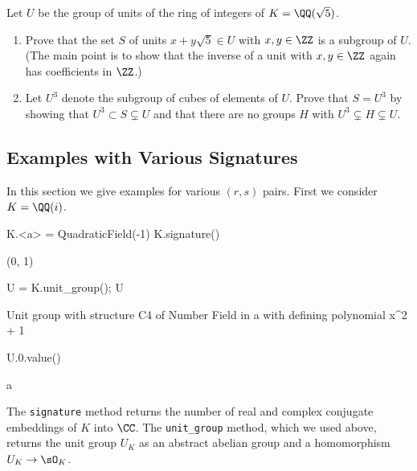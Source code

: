 \begin{exercise}
  Let $U$ be the group of units of the ring of integers
  of $K=\QQ(\sqrt{5})$.
  \begin{enumerate}
    \item Prove that the set $S$ of units $x+y\sqrt{5} \in U$ with
    $x,y\in\ZZ$ is a subgroup of $U$.  (The main point is to show that
    the inverse of a unit with $x,y\in\ZZ$ again has coefficients in
    $\ZZ$.)
    \item Let $U^3$ denote the subgroup of cubes of elements of $U$.
    Prove that $S=U^3$ by showing that $U^3\subset S \subsetneq U$ and
    that there are no groups $H$ with $U^3\subsetneq H \subsetneq U$.
  \end{enumerate}
\end{exercise}

\subsection{Examples with Various Signatures}

In this section we give examples for various $(r,s)$ pairs.
First we consider $K=\QQ(i)$.
\begin{sagecode}
\begin{sagecell}
K.<a> = QuadraticField(-1)
K.signature()
\end{sagecell}
\begin{sageout}
(0, 1)
\end{sageout}
\begin{sagecell}
U = K.unit_group(); U
\end{sagecell}
\begin{sageout}
Unit group with structure C4 of Number Field in a with
defining polynomial x^2 + 1
\end{sageout}
\begin{sagecell}
U.0.value()
\end{sagecell}
\begin{sageout}
a
\end{sageout}
\end{sagecode}

The {\tt signature} method returns the number of real and complex conjugate
embeddings of $K$ into $\CC$. The {\tt unit\_group} method, which we used above,
returns the unit group $U_K$ as an abstract abelian group and a
homomorphism $U_K\to \sO_K$.

